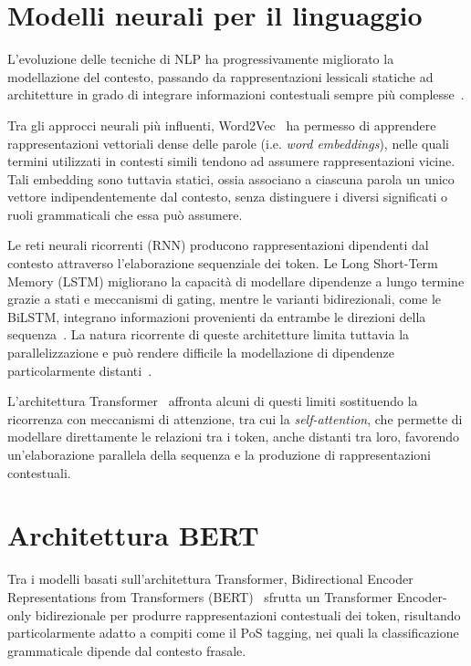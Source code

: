 \documentclass[12pt,a4paper]{report}
\begin{document}
\section{Modelli neurali per il linguaggio}
\label{sec:neural-language-models}

L'evoluzione delle tecniche di NLP ha progressivamente migliorato la modellazione del contesto, passando da rappresentazioni lessicali statiche ad architetture in grado di integrare informazioni contestuali sempre più complesse~\cite{goldberg2016}.

Tra gli approcci neurali più influenti, Word2Vec~\cite{mikolov2013} ha permesso di apprendere rappresentazioni vettoriali dense delle parole (i.e. \textit{word embeddings}), nelle quali termini utilizzati in contesti simili tendono ad assumere rappresentazioni vicine. Tali embedding sono tuttavia statici, ossia associano a ciascuna parola un unico vettore indipendentemente dal contesto, senza distinguere i diversi significati o ruoli grammaticali che essa può assumere.

Le reti neurali ricorrenti (RNN) producono rappresentazioni dipendenti dal contesto attraverso l'elaborazione sequenziale dei token. Le Long Short-Term Memory (LSTM) migliorano la capacità di modellare dipendenze a lungo termine grazie a stati e meccanismi di gating, mentre le varianti bidirezionali, come le BiLSTM, integrano informazioni provenienti da entrambe le direzioni della sequenza~\cite{goldberg2016,plank2016}. La natura ricorrente di queste architetture limita tuttavia la parallelizzazione e può rendere difficile la modellazione di dipendenze particolarmente distanti~\cite{vaswani2017}.

L'architettura Transformer~\cite{vaswani2017} affronta alcuni di questi limiti sostituendo la ricorrenza con meccanismi di attenzione, tra cui la \textit{self-attention}, che permette di modellare direttamente le relazioni tra i token, anche distanti tra loro, favorendo un'elaborazione parallela della sequenza e la produzione di rappresentazioni contestuali.

\section{Architettura BERT}
\label{sec:bert-architecture}

Tra i modelli basati sull'architettura Transformer, Bidirectional Encoder Representations from Transformers (BERT)~\cite{devlin2019} sfrutta un Transformer Encoder-only bidirezionale per produrre rappresentazioni contestuali dei token, risultando particolarmente adatto a compiti come il PoS tagging, nei quali la classificazione grammaticale dipende dal contesto frasale.
\end{document}

